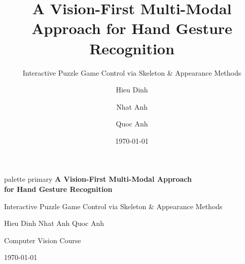 \documentclass[aspectratio=169]{beamer}
\title[Multi-Modal Hand Gesture]{A Vision-First Multi-Modal Approach for Hand Gesture Recognition}
\subtitle{Interactive Puzzle Game Control via Skeleton \& Appearance Methods}
\author[Hieu, Nhat Anh, Quoc Anh]{Hieu Dinh \and Nhat Anh \and Quoc Anh}
\institute{Computer Vision Course}
\date{\today}
\begin{document}
\begin{frame}[plain]
    \vfill
    \begin{beamercolorbox}[wd=\paperwidth,ht=2.5cm,dp=0.5cm,center]{palette primary}
        {\Large\bfseries\color{white}A Vision-First Multi-Modal Approach\\[0.3em]for Hand Gesture Recognition}
    \end{beamercolorbox}

    \vspace{0.5em}
    \centering
    {\small\color{primary} Interactive Puzzle Game Control via Skeleton \& Appearance Methods}

    \vspace{1.5em}
    {\normalsize Hieu Dinh \quad Nhat Anh \quad Quoc Anh}

    \vspace{0.5em}
    {\small Computer Vision Course}

    \vspace{0.3em}
    {\small \today}
    \vfill
\end{frame}
\end{document}
